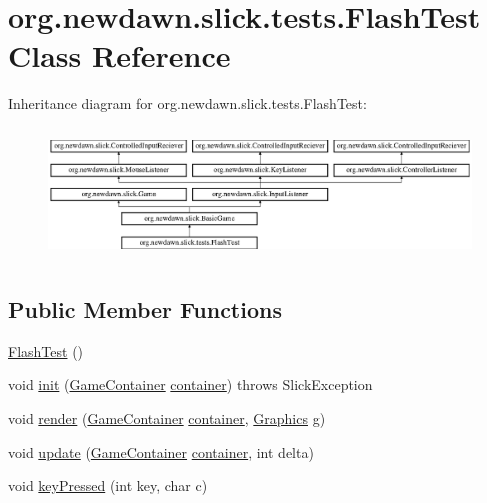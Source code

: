 \hypertarget{classorg_1_1newdawn_1_1slick_1_1tests_1_1_flash_test}{}\section{org.\+newdawn.\+slick.\+tests.\+Flash\+Test Class Reference}
\label{classorg_1_1newdawn_1_1slick_1_1tests_1_1_flash_test}
Inheritance diagram for org.\+newdawn.\+slick.\+tests.\+Flash\+Test\+:\begin{figure}[H]
\begin{center}
\leavevmode
\includegraphics[height=3.522012cm]{classorg_1_1newdawn_1_1slick_1_1tests_1_1_flash_test}
\end{center}
\end{figure}
\subsection*{Public Member Functions}
\begin{DoxyCompactItemize}
\item 
\mbox{\hyperlink{classorg_1_1newdawn_1_1slick_1_1tests_1_1_flash_test_a87a0e80ab43bf543fad77233ee937c24}{Flash\+Test}} ()
\item 
void \mbox{\hyperlink{classorg_1_1newdawn_1_1slick_1_1tests_1_1_flash_test_ac889c1ffd5bc065a39c2d83520dbedbd}{init}} (\mbox{\hyperlink{classorg_1_1newdawn_1_1slick_1_1_game_container}{Game\+Container}} \mbox{\hyperlink{classorg_1_1newdawn_1_1slick_1_1tests_1_1_flash_test_ad78e2796710293c14d8913b36a8e9e01}{container}})  throws Slick\+Exception 
\item 
void \mbox{\hyperlink{classorg_1_1newdawn_1_1slick_1_1tests_1_1_flash_test_a19cae927c317fc4535df1fb7c8c95d59}{render}} (\mbox{\hyperlink{classorg_1_1newdawn_1_1slick_1_1_game_container}{Game\+Container}} \mbox{\hyperlink{classorg_1_1newdawn_1_1slick_1_1tests_1_1_flash_test_ad78e2796710293c14d8913b36a8e9e01}{container}}, \mbox{\hyperlink{classorg_1_1newdawn_1_1slick_1_1_graphics}{Graphics}} g)
\item 
void \mbox{\hyperlink{classorg_1_1newdawn_1_1slick_1_1tests_1_1_flash_test_a14e18f7793ff0b37feb42c33d66b67a2}{update}} (\mbox{\hyperlink{classorg_1_1newdawn_1_1slick_1_1_game_container}{Game\+Container}} \mbox{\hyperlink{classorg_1_1newdawn_1_1slick_1_1tests_1_1_flash_test_ad78e2796710293c14d8913b36a8e9e01}{container}}, int delta)
\item 
void \mbox{\hyperlink{classorg_1_1newdawn_1_1slick_1_1tests_1_1_flash_test_acfd37557299ed60c45dbdc823ab892ac}{key\+Pressed}} (int key, char c)
\end{DoxyCompactItemize}
